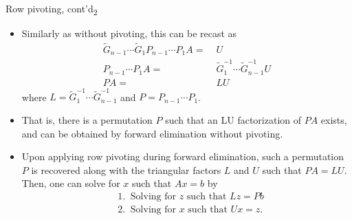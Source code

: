 \documentclass[t,usepdftitle=false]{beamer}
\begin{document}
\begin{frame}{Row pivoting, cont'd\textsubscript{2}}
\begin{itemize}
\item Similarly as without pivoting, this can be recast as
\begin{align*}
\widetilde{G}_{n-1}\cdots \widetilde{G}_1P_{n-1}\cdots P_1A=&\;U\\
P_{n-1}\cdots P_1A=&\;\widetilde{G}_1^{-1}\cdots \widetilde{G}_{n-1}^{-1}U\\
PA=&\;LU
\end{align*}
where $\displaystyle L=\widetilde{G}_1^{-1}\cdots \widetilde{G}_{n-1}^{-1}$ and $\displaystyle
P=P_{n-1}\cdots P_1$.
\item That is, there is a permutation $P$ such that an LU factorization of $PA$ exists, and can be obtained by forward elimination without pivoting.
\item Upon applying row pivoting during forward elimination, such a permutation $P$ is recovered along with the triangular factors $L$ and $U$ such that $PA=LU$.\vspace{.05cm}\\
Then, one can solve for $x$ such that $Ax=b$ by
\begin{align*}
&1.\;\;\text{Solving for }z\text{ such that }Lz=Pb\\
&2.\;\;\text{Solving for }x\text{ such that }Ux=z.
\end{align*}
\end{itemize}
\end{frame}
\end{document}
